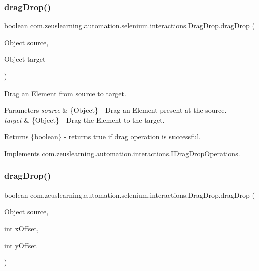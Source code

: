\subsubsection{\texorpdfstring{drag\+Drop()}{dragDrop()}\hspace{0.1cm}{\footnotesize\ttfamily [1/2]}}
{\footnotesize\ttfamily boolean com.\+zeuslearning.\+automation.\+selenium.\+interactions.\+Drag\+Drop.\+drag\+Drop (\begin{DoxyParamCaption}\item[{Object}]{source,  }\item[{Object}]{target }\end{DoxyParamCaption})\hspace{0.3cm}{\ttfamily [inline]}}

Drag an Element from {\ttfamily source} to {\ttfamily target}.


\begin{DoxyParams}{Parameters}
{\em source} & \{Object\} -\/ Drag an Element present at the {\ttfamily source}. \\
\hline
{\em target} & \{Object\} -\/ Drag the Element to the {\ttfamily target}.\\
\hline
\end{DoxyParams}
\begin{DoxyReturn}{Returns}
\{boolean\} -\/ returns {\ttfamily true} if drag operation is successful. 
\end{DoxyReturn}


Implements \hyperlink{interfacecom_1_1zeuslearning_1_1automation_1_1interactions_1_1IDragDropOperations_ad506f9b5c61783b1fa43fbaea26e3508}{com.\+zeuslearning.\+automation.\+interactions.\+I\+Drag\+Drop\+Operations}.

\hypertarget{classcom_1_1zeuslearning_1_1automation_1_1selenium_1_1interactions_1_1DragDrop_a94084c4d4b22a4970981f362ed7e9098}{}\label{classcom_1_1zeuslearning_1_1automation_1_1selenium_1_1interactions_1_1DragDrop_a94084c4d4b22a4970981f362ed7e9098} 
\subsubsection{\texorpdfstring{drag\+Drop()}{dragDrop()}\hspace{0.1cm}{\footnotesize\ttfamily [2/2]}}
{\footnotesize\ttfamily boolean com.\+zeuslearning.\+automation.\+selenium.\+interactions.\+Drag\+Drop.\+drag\+Drop (\begin{DoxyParamCaption}\item[{Object}]{source,  }\item[{int}]{x\+Offset,  }\item[{int}]{y\+Offset }\end{DoxyParamCaption})\hspace{0.3cm}{\ttfamily [inline]}}

